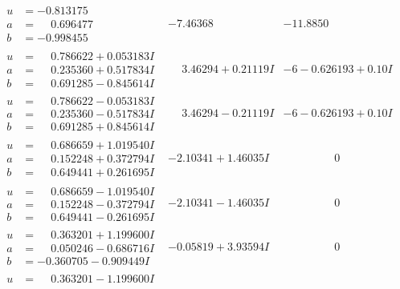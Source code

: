 \documentclass[1p]{elsarticle_modified}
\theoremstyle{definition}
\begin{document}
$$\begin{array}{c|c|c}
\begin{aligned}
u &= -0.813175\phantom{ +0.000000I} \\
a &= \phantom{-}0.696477\phantom{ +0.000000I} \\
b &= -0.998455\phantom{ +0.000000I}\end{aligned}
 & -7.46368\phantom{ +0.000000I} & -11.8850\phantom{ +0.000000I} \\ \hline\begin{aligned}
u &= \phantom{-}0.786622 + 0.053183 I \\
a &= \phantom{-}0.235360 + 0.517834 I \\
b &= \phantom{-}0.691285 - 0.845614 I\end{aligned}
 & \phantom{-}3.46294 + 0.21119 I &                  -6
-0.626193 + 0. 10   I\phantom{ +0.000000I} \\ \hline\begin{aligned}
u &= \phantom{-}0.786622 - 0.053183 I \\
a &= \phantom{-}0.235360 - 0.517834 I \\
b &= \phantom{-}0.691285 + 0.845614 I\end{aligned}
 & \phantom{-}3.46294 - 0.21119 I &                  -6
-0.626193 + 0. 10   I\phantom{ +0.000000I} \\ \hline\begin{aligned}
u &= \phantom{-}0.686659 + 1.019540 I \\
a &= \phantom{-}0.152248 + 0.372794 I \\
b &= \phantom{-}0.649441 + 0.261695 I\end{aligned}
 & -2.10341 + 1.46035 I & \phantom{-0.000000 } 0 \\ \hline\begin{aligned}
u &= \phantom{-}0.686659 - 1.019540 I \\
a &= \phantom{-}0.152248 - 0.372794 I \\
b &= \phantom{-}0.649441 - 0.261695 I\end{aligned}
 & -2.10341 - 1.46035 I & \phantom{-0.000000 } 0 \\ \hline\begin{aligned}
u &= \phantom{-}0.363201 + 1.199600 I \\
a &= \phantom{-}0.050246 - 0.686716 I \\
b &= -0.360705 - 0.909449 I\end{aligned}
 & -0.05819 + 3.93594 I & \phantom{-0.000000 } 0 \\ \hline\begin{aligned}
u &= \phantom{-}0.363201 - 1.199600 I \\

\end{aligned}
\end{array}$$
\end{document}
